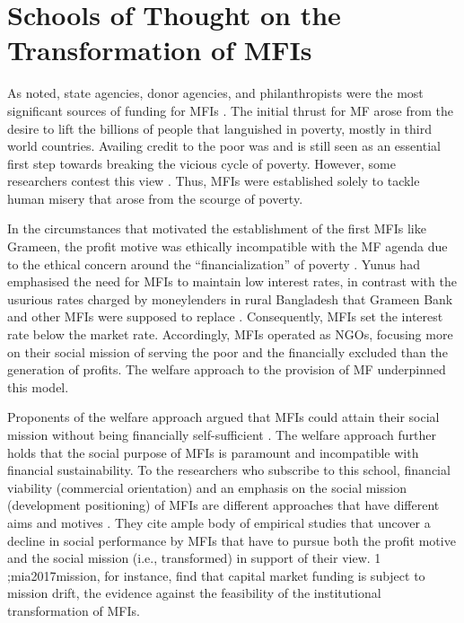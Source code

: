 \documentclass[a4paper, nobind]{templates/ociamthesis}
\begin{document}
\hypertarget{schools-of-thought-on-the-transformation-of-mfis}{%
\section{Schools of Thought on the Transformation of MFIs}\label{schools-of-thought-on-the-transformation-of-mfis}}

\noindent As noted, state agencies, donor agencies, and philanthropists were the most significant sources of funding for MFIs \autocite{ledgerwood1998microfinance,ledgerwood2006transforming}. The initial thrust for MF arose from the desire to lift the billions of people that languished in poverty, mostly in third world countries. Availing credit to the poor was and is still seen as an essential first step towards breaking the vicious cycle of poverty. However, some researchers contest this view \autocite{bateman2010doesn,adams2016microfinance,onyuma2005myths}. Thus, MFIs were established solely to tackle human misery that arose from the scourge of poverty.

In the circumstances that motivated the establishment of the first MFIs like Grameen, the profit motive was ethically incompatible with the MF agenda \autocite{ghosh2013microfinance,la2006new} due to the ethical concern around the ``financialization'' of poverty \autocite{mader2015financialization}. Yunus had emphasised the need for MFIs to maintain low interest rates, in contrast with the usurious rates charged by moneylenders in rural Bangladesh that Grameen Bank and other MFIs were supposed to replace \autocite{bateman2010doesn}. Consequently, MFIs set the interest rate below the market rate. Accordingly, MFIs operated as NGOs, focusing more on their social mission of serving the poor and the financially excluded than the generation of profits. The welfare approach to the provision of MF underpinned this model.

Proponents of the welfare approach argued that MFIs could attain their social mission without being financially self-sufficient \autocite{kodongo2013individual}. The welfare approach further holds that the social purpose of MFIs is paramount and incompatible with financial sustainability. To the researchers who subscribe to this school, financial viability (commercial orientation) and an emphasis on the social mission (development positioning) of MFIs are different approaches that have different aims and motives \autocite{toindepi2016investigating}. They cite ample body of empirical studies that uncover a decline in social performance by MFIs that have to pursue both the profit motive and the social mission (i.e., transformed) in support of their view. 1 ;mia2017mission, for instance, find that capital market funding is subject to mission drift, the evidence against the feasibility of the institutional transformation of MFIs.
\end{document}
